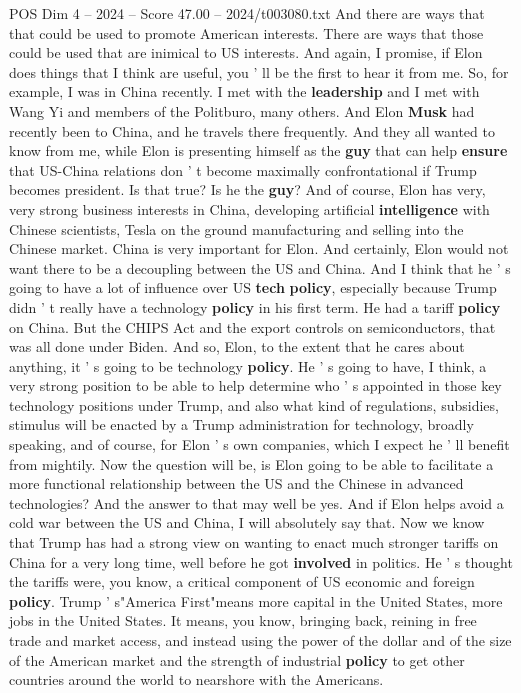 \begin{textsample}{POS Dim 4 – 2024 – Score 47.00 – 2024/t003080.txt}
And there are ways that that could be used to promote American interests.
There are ways that those could be used that are inimical to US interests.
And again, I promise, if Elon does things that I think are useful, you ' ll be the first to hear it from me.
So, for example, I was in China recently.
I met with the \textbf{leadership} and I met with Wang Yi and members of the Politburo, many others.
And Elon \textbf{Musk} had recently been to China, and he travels there frequently.
And they all wanted to know from me, while Elon is presenting himself as the \textbf{guy} that can help \textbf{ensure} that US-China relations don ' t become maximally confrontational if Trump becomes president.
Is that true?
Is he the \textbf{guy}?
And of course, Elon has very, very strong business interests in China, developing artificial \textbf{intelligence} with Chinese scientists, Tesla on the ground manufacturing and selling into the Chinese market.
China is very important for Elon.
And certainly, Elon would not want there to be a decoupling between the US and China.
And I think that he ' s going to have a lot of influence over US \textbf{tech} \textbf{policy}, especially because Trump didn ' t really have a technology \textbf{policy} in his first term.
He had a tariff \textbf{policy} on China.
But the CHIPS Act and the export controls on semiconductors, that was all done under Biden.
And so, Elon, to the extent that he cares about anything, it ' s going to be technology \textbf{policy}.
He ' s going to have, I think, a very strong position to be able to help determine who ' s appointed in those key technology positions under Trump, and also what kind of regulations, subsidies, stimulus will be enacted by a Trump administration for technology, broadly speaking, and of course, for Elon ' s own companies, which I expect he ' ll benefit from mightily.
Now the question will be, is Elon going to be able to facilitate a more functional relationship between the US and the Chinese in advanced technologies?
And the answer to that may well be yes.
And if Elon helps avoid a cold war between the US and China, I will absolutely say that.
Now we know that Trump has had a strong view on wanting to enact much stronger tariffs on China for a very long time, well before he got \textbf{involved} in politics.
He ' s thought the tariffs were, you know, a critical component of US economic and foreign \textbf{policy}.
Trump ' s"America First"means more capital in the United States, more jobs in the United States.
It means, you know, bringing back, reining in free trade and market access, and instead using the power of the dollar and of the size of the American market and the strength of industrial \textbf{policy} to get other countries around the world to nearshore with the Americans.

\end{textsample}

